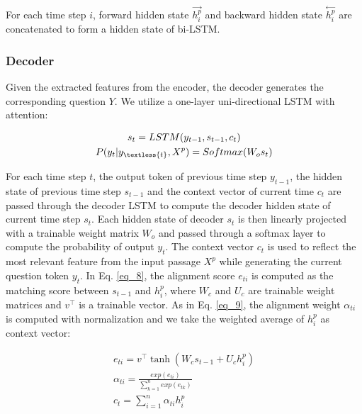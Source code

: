 \documentclass[letterpaper]{article} %
\begin{document}
For each time step \(i\), forward hidden state \(\overset{\rightarrow}{h^p_i}\) and backward hidden state \(\overset{\leftarrow}{h^p_i}\) are concatenated to form a hidden state of bi-LSTM. 

\subsubsection{Decoder}
Given the extracted features from the encoder, the decoder generates the corresponding question \(Y\). We utilize a one-layer uni-directional LSTM with attention:

\begin{gather}
s_t = LSTM(y_{t-1}, s_{t-1}, c_t) \label{eq_6} \\
P(y_t |y_{\textless{t}}, X^p) = Softmax(W_os_t) \label{eq_7}
\end{gather}

For each time step \(t\), the output token of previous time step \(y_{t-1}\), the hidden state of previous time step \(s_{t-1}\) and the context vector of current time \(c_t\) are passed through the decoder LSTM to compute the decoder hidden state of current time step \(s_t\). Each hidden state of decoder \(s_{t}\) is then linearly projected with a trainable weight matrix \(W_o\) and passed through a softmax layer to compute the probability of output \(y_t\). The context vector \(c_t\) is used to reflect the most relevant feature from the input passage \(X^p\) while generating the current question token \(y_t\).  In Eq. \eqref{eq_8},  the alignment score \(e_{ti}\) is computed as the matching score between \(s_{t-1}\) and \(h^p_i\), where \(W_c\) and \(U_c\) are trainable weight matrices and \(v^{\top}\) is a trainable vector. As in Eq. \eqref{eq_9}, the alignment weight \(\alpha_{ti}\) is computed with normalization and we take the weighted average of \(h^p_i\) as context vector:

\begin{gather}
e_{ti} = v^{\top}\tanh(W_cs_{t-1} + U_ch^p_i) \label{eq_8} \\
\alpha_{ti} = \frac{exp(e_{ti})}{\sum^{n}_{k=1}exp(e_{tk})} \label{eq_9} \\
c_t = \sum^{n}_{i=1}\alpha_{ti}h^p_i \label{eq_10}
\end{gather}
\end{document}
